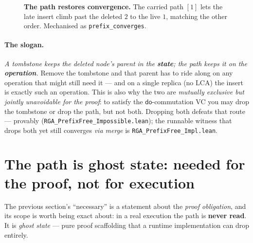 \documentclass[11pt]{article}
\newcommand{\doo}{\mathsf{do}}
\newcommand{\resolve}{\mathsf{resolve}}
\newcommand{\Ins}{\mathsf{Ins}}
\newcommand{\Del}{\mathsf{Del}}
\begin{document}
\begin{figure}[h]
\centering
{}
\caption{\textbf{The path restores convergence.} The carried path $[1]$ lets the
late insert climb past the deleted $2$ to the live $1$, matching the other order.
Mechanised as \texttt{prefix\_converges}.}
\label{fig:fix}
\end{figure}

\paragraph{The slogan.} \emph{A tombstone keeps the deleted node's parent in the
\textbf{state}; the path keeps it on the \textbf{operation}.} Remove the tombstone
and that parent has to ride along on any operation that might still need it --- and
on a single replica (no LCA) the insert is exactly such an operation. This is also
why the two are \emph{mutually exclusive but jointly unavoidable for the proof}: to
satisfy the $\doo$-commutation VC you may drop the tombstone or drop the path, but
not both. Dropping both defeats that route --- provably
(\texttt{RGA\_PrefixFree\_Impossible.lean}); the runnable witness that drops both
yet still converges \emph{via merge} is \texttt{RGA\_PrefixFree\_Impl.lean}.

\section{The path is ghost state: needed for the proof, not for execution}
\label{sec:ghost}

The previous section's ``necessary'' is a statement about the \emph{proof
obligation}, and its scope is worth being exact about: in a real execution the
path is \textbf{never read}. It is \emph{ghost state} --- pure proof scaffolding
that a runtime implementation can drop entirely.
\end{document}
